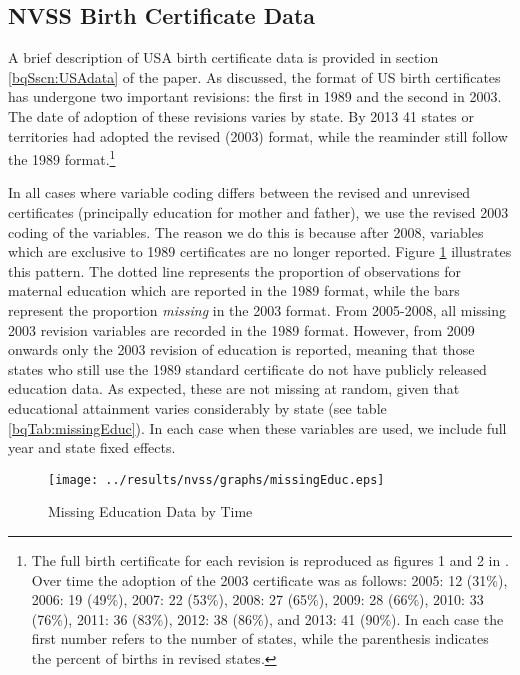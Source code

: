 \documentclass[a4paper, 11 pt]{article}
\theoremstyle{plain}
\begin{document}
\begin{spacing}{1.2}
\subsection{NVSS Birth Certificate Data}
A brief description of USA birth certificate data is provided in section 
\ref{bqSscn:USAdata} of the paper.  As discussed, the format of US birth
certificates has undergone two important revisions: the first in 1989
and the second in 2003.  The date of adoption of these revisions varies 
by state.  By 2013 41 states or territories had adopted the revised (2003)
format, while the reaminder still follow the 1989 format.\footnote{The full
birth certificate for each revision is reproduced as figures 1 and 2 in
\citet{MenackerMartin2005}.  Over time the adoption of the 2003 certificate 
was as follows: 2005: 12 (31\%), 2006: 19 (49\%), 2007: 22 (53\%), 2008: 27 
(65\%), 2009: 28 (66\%), 2010: 33 (76\%), 2011: 36 (83\%), 2012: 38 (86\%),
and 2013: 41 (90\%).  In each case the first number refers to the number
of states, while the parenthesis indicates the percent of births in revised
states.}

In all cases where variable coding differs between the revised and unrevised
certificates (principally education for mother and father), we use the revised
2003 coding of the variables.  The reason we do this is because after 2008,
variables which are exclusive to 1989 certificates are no longer reported.
Figure \ref{bqFig:educMissing} illustrates this pattern.  The dotted line 
represents the proportion of observations for maternal education which are
reported in the 1989 format, while the bars represent the proportion 
\emph{missing} in the 2003 format.  From 2005-2008, all missing 2003 revision
variables are recorded in the 1989 format.  However, from 2009 onwards only
the 2003 revision of education is reported, meaning that those states who
still use the 1989 standard certificate do not have publicly released education
data.  As expected, these are not missing at random, given that educational
attainment varies considerably by state (see table \ref{bqTab:missingEduc}).
In each case when these variables are used, we include full year and state
fixed effects.  
\begin{figure}[htpb!]
\caption{Missing Education Data by Time}
\label{bqFig:educMissing}
\texttt{[image: ../results/nvss/graphs/missingEduc.eps]}
\end{figure}



\end{spacing}
\end{document}

